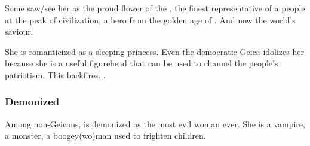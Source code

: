 Some saw/see her as the proud flower of the \VaimonCaliphate, the finest representative of a people at the peak of civilization, a hero from the golden age of \humanity. 
And now the world's saviour. 


She is romanticized as a sleeping princess. 
Even the democratic Geica idolizes her because she is a useful figurehead that can be used to channel the people's patriotism. 
This backfires... 










\subsubsection{Demonized}
Among non-Geicans, \Belzir{} is demonized as the most evil woman ever. 
She is a vampire, a monster, a boogey(wo)man used to frighten children.

